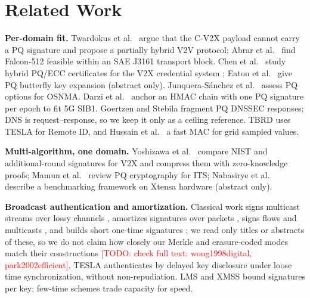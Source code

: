 \documentclass[conference]{IEEEtran}
\newcommand{\todo}[1]{\textcolor{red}{[TODO: #1]}}
\begin{document}
\section{Related Work}
\label{sec:related}

\textbf{Per-domain fit.} Twardokus et al.\ \cite{twardokus2024when} argue
that the C-V2X payload cannot carry a PQ signature and propose a partially
hybrid V2V protocol; Abrar et al.\ \cite{abrar2026deployment} find
Falcon-512 feasible within an SAE J3161 transport block. Chen et al.\
\cite{chen2025hybrid,chen2026pseudonym} study hybrid PQ/ECC certificates for
the V2X credential system \cite{brecht2018security}; Eaton et al.\
\cite{eaton2024provably} give PQ butterfly key expansion (abstract only).
Junquera-S\'anchez et al.\ \cite{junquera2023assessment} assess PQ options
for OSNMA. Darzi et al.\ \cite{darzi2026a} anchor an HMAC chain with one PQ
signature per epoch to fit 5G SIB1. Goertzen and Stebila
\cite{goertzen2022post} fragment PQ DNSSEC responses; DNS is
request--response, so we keep it only as a ceiling reference. TBRD
\cite{veara2025tbrd} uses TESLA for Remote ID, and Hussain et al.\
\cite{hussain2026a} a fast MAC for grid sampled values.

\textbf{Multi-algorithm, one domain.} Yoshizawa et al.\
\cite{yoshizawa2026a} compare NIST and additional-round signatures for V2X
and compress them with zero-knowledge proofs; Mamun et al.\
\cite{mamun2026post} review PQ cryptography for ITS; Nabasirye et al.\
\cite{nabasirye2026security} describe a benchmarking framework on Xtensa
hardware (abstract only).

\textbf{Broadcast authentication and amortization.} Classical work signs
multicast streams over lossy channels \cite{perrig2000efficient}, amortizes
signatures over packets \cite{park2002efficient}, signs flows and multicasts
\cite{wong1998digital}, and builds short one-time signatures
\cite{reyzin2002better}; we read only titles or abstracts of these, so we do
not claim how closely our Merkle and erasure-coded modes match their
constructions \todo{check full text: wong1998digital, park2002efficient}.
TESLA \cite{perrig2005tesla} authenticates by delayed key disclosure under
loose time synchronization, without non-repudiation. LMS
\cite{lms2019rfc8554} and XMSS \cite{xmss2018rfc8391} bound signatures per
key; few-time schemes \cite{sedghighadikolaei2024fast,sedghighadikolaei2024signer}
trade capacity for speed.
\end{document}
